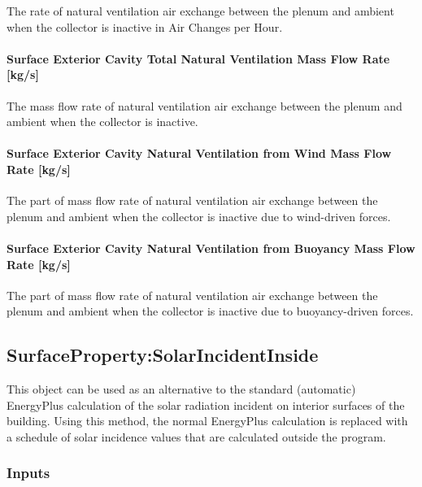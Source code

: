 The rate of natural ventilation air exchange between the plenum and ambient when the collector is inactive in Air Changes per Hour.

\paragraph{Surface Exterior Cavity Total Natural Ventilation Mass Flow Rate {[}kg/s{]}}\label{surface-exterior-cavity-total-natural-ventilation-mass-flow-rate-kgs}

The mass flow rate of natural ventilation air exchange between the plenum and ambient when the collector is inactive.

\paragraph{Surface Exterior Cavity Natural Ventilation from Wind Mass Flow Rate {[}kg/s{]}}\label{surface-exterior-cavity-natural-ventilation-from-wind-mass-flow-rate-kgs}

The part of mass flow rate of natural ventilation air exchange between the plenum and ambient when the collector is inactive due to wind-driven forces.

\paragraph{Surface Exterior Cavity Natural Ventilation from Buoyancy Mass Flow Rate {[}kg/s{]}}\label{surface-exterior-cavity-natural-ventilation-from-buoyancy-mass-flow-rate-kgs}

The part of mass flow rate of natural ventilation air exchange between the plenum and ambient when the collector is inactive due to buoyancy-driven forces.

\subsection{SurfaceProperty:SolarIncidentInside}\label{surfacepropertysolarincidentinside}

This object can be used as an alternative to the standard (automatic) EnergyPlus calculation of the solar radiation incident on interior surfaces of the building. Using this method, the normal EnergyPlus calculation is replaced with a schedule of solar incidence values that are calculated outside the program.

\subsubsection{Inputs}\label{inputs-14}

